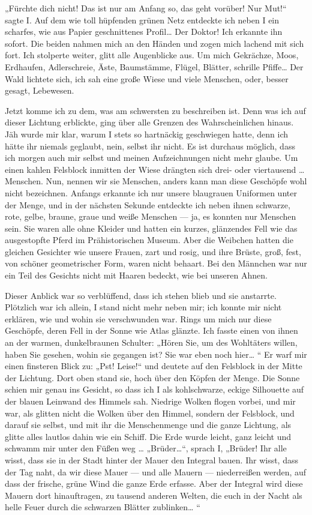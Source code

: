 „Fürchte dich nicht! Das ist nur am Anfang so, das geht vorüber!
Nur Mut!“ sagte I. Auf dem wie toll hüpfenden grünen Netz entdeckte
ich
neben I ein scharfes, wie aus Papier geschnittenes Profil\ldots{} Der
Doktor! Ich erkannte ihn sofort. Die beiden nahmen mich an den
Händen und zogen mich lachend mit sich fort. Ich stolperte weiter,
glitt alle Augenblicke aus. Um mich Gekrächze, Moos, Erdhaufen,
Adlerschreie, Äste, Baumstämme, Flügel, Blätter, schrille Pfiffe\ldots{}
Der Wald lichtete sich, ich sah eine große Wiese und viele
Menschen, oder, besser gesagt, Lebewesen.

Jetzt komme ich zu dem, was am schwersten zu beschreiben ist. Denn
was ich auf dieser Lichtung erblickte, ging über alle Grenzen des
Wahrscheinlichen hinaus. Jäh wurde mir klar, warum I stets so
hartnäckig geschwiegen hatte, denn ich hätte ihr niemals geglaubt,
nein, selbst ihr nicht. Es ist durchaus möglich, dass ich morgen
auch mir selbst und meinen Aufzeichnungen nicht mehr glaube. Um
einen kahlen Felsblock inmitten der Wiese drängten sich drei- oder
viertausend \ldots{} Menschen. Nun, nennen wir sie Menschen, anders kann
man diese Geschöpfe wohl nicht bezeichnen. Anfangs erkannte ich nur
unsere blaugrauen Uniformen unter der Menge, und in der nächsten
Sekunde entdeckte ich neben ihnen schwarze, rote, gelbe, braune,
graue und weiße Menschen — ja, es konnten nur Menschen sein. Sie
waren alle ohne Kleider und hatten ein kurzes, glänzendes Fell wie
das ausgestopfte Pferd im Prähistorischen Museum. Aber die Weibchen
hatten die gleichen Gesichter wie unsere Frauen, zart und rosig,
und ihre Brüste, groß, fest, von schöner geometrischer Form, waren
nicht behaart. Bei den Männchen war nur ein Teil des Gesichts nicht
mit Haaren bedeckt, wie bei unseren Ahnen.

Dieser Anblick war so verblüffend, dass ich stehen blieb und sie
anstarrte. Plötzlich war ich allein, I stand nicht mehr neben mir;
ich
konnte mir nicht erklären, wie und wohin sie verschwunden war.
Rings um mich nur diese Geschöpfe, deren Fell in der Sonne wie
Atlas glänzte. Ich fasste einen von ihnen an der warmen,
dunkelbraunen Schulter: „Hören Sie, um des Wohltäters willen, haben
Sie gesehen, wohin sie gegangen ist? Sie war eben noch hier\ldots{} “ Er
warf mir einen finsteren Blick zu: „Pst! Leise!“ und deutete auf
den Felsblock in der Mitte der Lichtung. Dort oben stand sie, hoch
über den Köpfen der Menge. Die Sonne schien mir genau ins Gesicht,
so dass ich I als kohlschwarze, eckige Silhouette auf der blauen
Leinwand des Himmels sah. Niedrige Wolken flogen vorbei, und mir
war, als glitten nicht die Wolken über den Himmel, sondern der
Felsblock, und darauf sie selbst, und mit ihr die Menschenmenge und
die ganze Lichtung, als glitte alles lautlos dahin wie ein Schiff.
Die Erde wurde leicht, ganz leicht und schwamm mir unter den Füßen
weg \ldots{} „Brüder\ldots{}“, sprach I, „Brüder! Ihr alle wisst, dass sie in
der Stadt hinter der Mauer den Integral bauen. Ihr wisst, dass der
Tag naht, da wir diese Mauer — und alle Mauern — niederreißen
werden, auf dass der frische, grüne Wind die ganze Erde erfasse.
Aber der Integral wird diese Mauern dort hinauftragen, zu tausend
anderen Welten, die euch in der Nacht als helle Feuer durch die
schwarzen Blätter zublinken\ldots{} “

